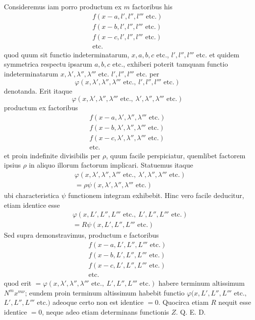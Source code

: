 Consideremus iam porro productum ex $m$ factoribus his
\[
\begin{gathered}
f(x-a,l',l'',l'''\text{ etc.})\\
f(x-b,l',l'',l'''\text{ etc.})\\
f(x-c,l',l'',l'''\text{ etc.})\\
\text{etc.}
\end{gathered}
\]
quod quum sit functio indeterminatarum, $x,a,b,c$ etc., $l',l'',l'''$ etc. et quidem
symmetrica respectu ipsarum $a,b,c$ etc., exhiberi poterit tamquam functio indeterminatarum $x,\lambda',\lambda'',\lambda'''$ etc. $l',l'',l'''$ etc. per
\[
\varphi(x,\lambda',\lambda'',\lambda'''\text{ etc.},\ l',l'',l'''\text{ etc.})
\]
denotanda. Erit itaque
\[
\varphi(x,\lambda',\lambda'',\lambda'''\text{ etc.},\ \lambda',\lambda'',\lambda'''\text{ etc.})
\]
productum ex factoribus
\[
\begin{gathered}
f(x-a,\lambda',\lambda'',\lambda'''\text{ etc.})\\
f(x-b,\lambda',\lambda'',\lambda'''\text{ etc.})\\
f(x-c,\lambda',\lambda'',\lambda'''\text{ etc.})\\
\text{etc.}
\end{gathered}
\]
et proin indefinite divisibilis per $\rho$, quum facile perspiciatur, quemlibet factorem
ipsius $\rho$ in aliquo illorum factorum implicari. Statuemus itaque
\[
\begin{aligned}
&\varphi(x,\lambda',\lambda'',\lambda'''\text{ etc.},\ \lambda',\lambda'',\lambda'''\text{ etc.})\\
&=\rho\psi(x,\lambda',\lambda'',\lambda'''\text{ etc.})
\end{aligned}
\]
ubi characteristica $\psi$ functionem integram exhibebit. Hinc vero facile deducitur,
etiam identice esse
\[
\begin{aligned}
&\varphi(x,\allowbreak L',\allowbreak L'',\allowbreak L'''\text{ etc.},\allowbreak \ L',\allowbreak L'',\allowbreak L'''\text{ etc.})\\
&=R\psi(x,L',L'',L'''\text{ etc.})
\end{aligned}
\]
Sed supra demonstravimus, productum e factoribus
\[
\begin{gathered}
f(x-a,L',L'',L'''\text{ etc.})\\
f(x-b,L',L'',L'''\text{ etc.})\\
f(x-c,L',L'',L'''\text{ etc.})\\
\text{etc.}
\end{gathered}
\]
quod erit $=\varphi(x,\lambda',\lambda'',\lambda'''\text{ etc.},\ L',L'',L'''\text{ etc.})$ habere terminum altissimum
$N^mx^{m\nu}$; eundem proin terminum altissimum habebit functio $\varphi(x,\allowbreak L',\allowbreak L'',\allowbreak L'''\text{ etc.},\allowbreak $
$L',L'',L'''\text{ etc.})$ adeoque certo non est identice $=0$. Quocirca etiam $R$ nequit
esse identice $=0$, neque adeo etiam determinans functionis $Z$. Q. E. D.

